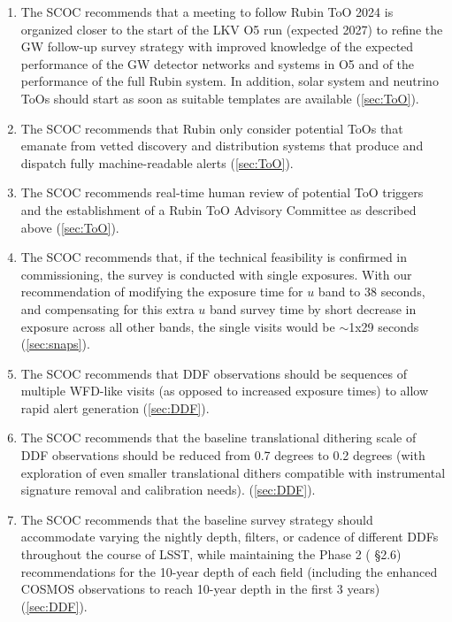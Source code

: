 \begin{enumerate}
\item The SCOC recommends that a meeting to follow Rubin ToO 2024 is organized closer to the start of the LKV O5 run (expected 2027) to refine the GW follow-up survey strategy with improved knowledge of the expected performance of the GW detector networks and systems in O5 and of the performance of the full Rubin system. In addition, solar system and neutrino ToOs should start as soon as suitable templates are available (\autoref{sec:ToO}).

\item The SCOC recommends that Rubin only consider potential ToOs that emanate from vetted discovery and distribution systems that produce and dispatch fully machine-readable alerts (\autoref{sec:ToO}).

\item The SCOC recommends real-time human review of potential ToO triggers and the establishment of a Rubin ToO Advisory Committee as described above (\autoref{sec:ToO}).

\item The SCOC recommends that, if the technical feasibility is confirmed in commissioning, the survey is conducted with single exposures. With our recommendation of modifying the exposure time for $u$ band to 38 seconds, and compensating for this extra $u$ band survey time by short decrease in exposure across all other bands, the single visits would be $\sim$1x29 seconds (\autoref{sec:snaps}).

\item The SCOC recommends that DDF observations should be sequences of multiple WFD-like visits (as opposed to increased exposure times) to allow rapid alert generation (\autoref{sec:DDF}).

\item The SCOC recommends that the baseline translational dithering scale of DDF observations should be reduced from 0.7 degrees to 0.2 degrees (with exploration of even smaller translational dithers compatible with instrumental signature removal and calibration needs). (\autoref{sec:DDF}).

\item The SCOC recommends that the baseline survey strategy should accommodate varying the nightly depth, filters, or cadence of different DDFs throughout the course of LSST, while maintaining the Phase 2 ( \S2.6) recommendations for the 10-year depth of each field (including the enhanced COSMOS observations to reach 10-year depth in the first 3 years) (\autoref{sec:DDF}).


\end{enumerate}
